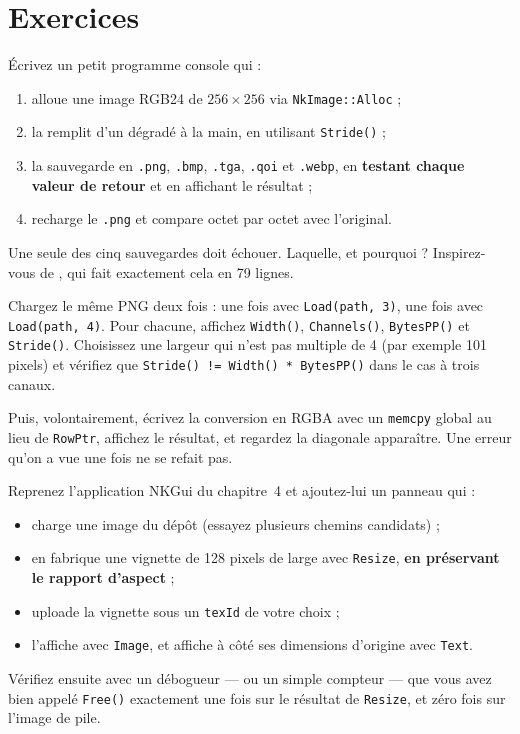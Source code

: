 \section{Exercices}

\begin{nkdemo}
Écrivez un petit programme console qui :
\begin{enumerate}
  \item alloue une image RGB24 de $256 \times 256$ via \texttt{NkImage::Alloc} ;
  \item la remplit d'un dégradé à la main, en utilisant \texttt{Stride()} ;
  \item la sauvegarde en \texttt{.png}, \texttt{.bmp}, \texttt{.tga},
        \texttt{.qoi} et \texttt{.webp}, en \textbf{testant chaque valeur de
        retour} et en affichant le résultat ;
  \item recharge le \texttt{.png} et compare octet par octet avec l'original.
\end{enumerate}
Une seule des cinq sauvegardes doit échouer. Laquelle, et pourquoi ? Inspirez-vous
de , qui fait exactement cela
en 79 lignes.
\end{nkdemo}

\begin{nkdemo}
Chargez le même PNG deux fois : une fois avec \texttt{Load(path, 3)}, une fois
avec \texttt{Load(path, 4)}. Pour chacune, affichez \texttt{Width()},
\texttt{Channels()}, \texttt{BytesPP()} et \texttt{Stride()}. Choisissez une
largeur qui n'est pas multiple de 4 (par exemple 101 pixels) et vérifiez que
\texttt{Stride() != Width() * BytesPP()} dans le cas à trois canaux.

Puis, volontairement, écrivez la conversion en RGBA avec un \texttt{memcpy}
global au lieu de \texttt{RowPtr}, affichez le résultat, et regardez la
diagonale apparaître. Une erreur qu'on a vue une fois ne se refait pas.
\end{nkdemo}

\begin{nkpratique}
Reprenez l'application NKGui du chapitre~4 et ajoutez-lui un panneau qui :
\begin{itemize}
  \item charge une image du dépôt (essayez plusieurs chemins candidats) ;
  \item en fabrique une vignette de 128 pixels de large avec \texttt{Resize},
        \textbf{en préservant le rapport d'aspect} ;
  \item uploade la vignette sous un \texttt{texId} de votre choix ;
  \item l'affiche avec \texttt{Image}, et affiche à côté ses dimensions
        d'origine avec \texttt{Text}.
\end{itemize}
Vérifiez ensuite avec un débogueur — ou un simple compteur — que vous avez bien
appelé \texttt{Free()} exactement une fois sur le résultat de \texttt{Resize},
et zéro fois sur l'image de pile.
\end{nkpratique}

